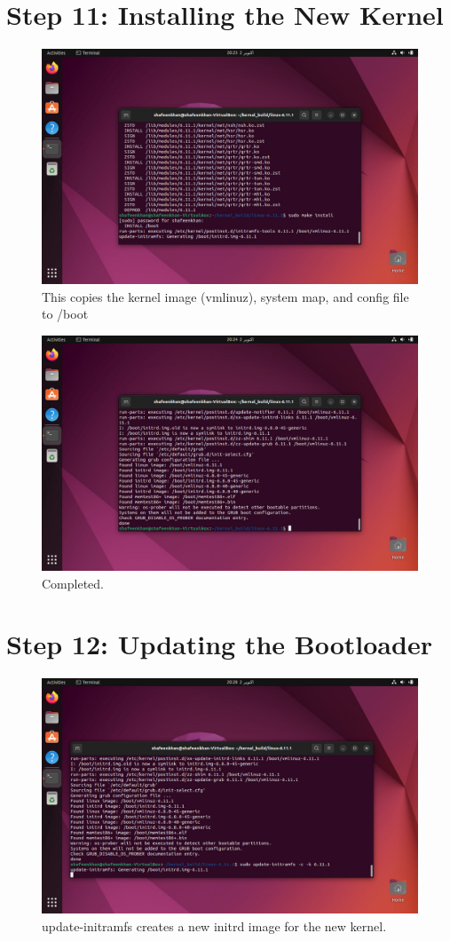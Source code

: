 \documentclass{article}
\begin{document}
\section{Step 11: Installing the New Kernel}
\begin{figure}[H]
    \centering
    \includegraphics[width=0.8\linewidth]{06.jpg}
    \caption{This copies the kernel image (vmlinuz), system map, and config file to /boot}
\end{figure}

\begin{figure}[H]
    \centering
    \includegraphics[width=0.8\linewidth]{05.jpg}
    \caption{Completed.}
\end{figure}

\section{Step 12: Updating the Bootloader}
\begin{figure}[H]
    \centering
    \includegraphics[width=0.8\linewidth]{03.jpg}
    \caption{update-initramfs creates a new initrd image for the new kernel.}
\end{figure}
\end{document}
